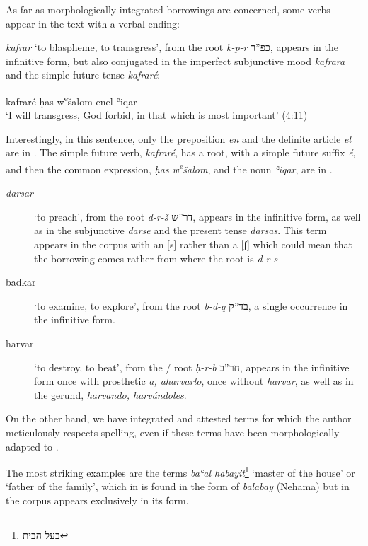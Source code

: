 \documentclass[output=paper,colorlinks,citecolor=brown,babel,arabicfont]{langscibook}
\begin{document}
As far as morphologically integrated borrowings are concerned, some  verbs appear in the text with a  verbal ending: 

\textit{kafrar} `to blaspheme, to transgress', from the  root \textit{k-p-r} \texthebrew{כפ''ר}, appears in the infinitive form, but also conjugated in the imperfect subjunctive mood \textit{kafrara} and the simple future tense \textit{kafraré}:

\ea\label{ch3.7.ex.n1}
{kafraré} {ḥas w\textsuperscript{e}šalom} {enel ʿiqar} \\ 
`I will transgress, God forbid, in that which is most important' (4:11)
\z

Interestingly, in this sentence, only the preposition \textit{en} and the definite article \textit{el} are in . The simple future verb, \textit{kafraré}, has a  root, with a  simple future suffix \textit{é}, and then the common expression, \textit{ḥas w\textsuperscript{e}šalom}, and the noun \textit{ʿiqar}, are in .

\begin{description}
 \item[\textit{darsar}] `to preach', from the  root \textit{d-r-š} \texthebrew{דר''ש}, appears in the infinitive form, as well as in the subjunctive \textit{darse} and the present tense \textit{darsas}. This term appears in the corpus with an [s] rather than a [ʃ] which could mean that the borrowing comes rather from  where the root is \textit{d-r-s} 

\item[{badkar}] `to examine, to explore', from the  root \textit{b-d-q} \texthebrew{בד''ק}, a single occurrence in the infinitive form.

\item[{harvar}] `to destroy, to beat', from the / root \textit{ḥ-r-b} \texthebrew{חר''ב}, appears in the infinitive form once with prosthetic \textit{a, aharvarlo}, once without \textit{harvar}, as well as in the gerund, \textit{harvando, harvándoles}.
\end{description}

On the other hand, we have integrated and attested terms for which the author meticulously respects  spelling, even if these terms have been morphologically adapted to .

The most striking examples are the terms \textit{baʿal habayit}\footnote{\texthebrew{בעל הבית}} `master of the house' or `father of the family', which in  is found in the form of \textit{balabay} (Nehama) but in the corpus appears exclusively in its  form.
\end{document}
